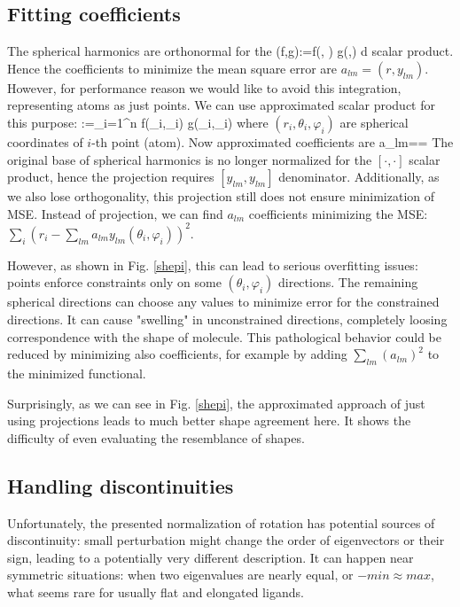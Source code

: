 \documentclass[10pt,journal]{IEEEtranTCOM}
\theoremstyle{plain}
\begin{document}
\subsection{Fitting coefficients} \label{fitting}
The spherical harmonics are orthonormal for the
\be (f,g):=\int f(\theta, \varphi) g(\theta,\varphi) d\Omega\ee
scalar product. Hence the coefficients to minimize the mean square error are $a_{lm}=(r,y_{lm})$. However, for performance reason we would like to avoid this integration, representing atoms as just points. We can use approximated scalar product for this purpose:
\be [f,g]:=\sum_{i=1}^n f(\theta_i,\varphi_i) g(\theta_i,\varphi_i)\ee
where $(r_i,\theta_i,\varphi_i)$ are spherical coordinates of $i$-th point (atom). Now approximated coefficients are
\be a_{lm}=\frac{[r,y_{lm}]}{[y_{lm},y_{lm}]}= \label{proj}\ee
The original base of spherical harmonics is no longer normalized for the $[\cdot,\cdot]$ scalar product, hence the projection requires $[y_{lm},y_{lm}]$ denominator. Additionally, as we also lose orthogonality, this projection still does not ensure minimization of MSE. Instead of projection, we can find $a_{lm}$ coefficients minimizing the MSE: $\sum_i \left(r_i - \sum_{lm} a_{lm} y_{lm}(\theta_i,\varphi_i)\right)^2$.

However, as shown in Fig. \ref{shepi}, this can lead to serious overfitting issues: points enforce constraints only on some $(\theta_i,\varphi_i)$ directions. The remaining spherical directions can choose any values to minimize error for the constrained directions. It can cause "swelling" in unconstrained directions, completely loosing correspondence with the shape of molecule. This pathological behavior could be reduced by minimizing also coefficients, for example by adding $\sum_{lm} (a_{lm})^2$ to the minimized functional.

Surprisingly, as we can see in Fig. \ref{shepi}, the approximated approach of just using projections leads to much better shape agreement here. It shows the difficulty of even evaluating the resemblance of shapes.
\subsection{Handling discontinuities}
Unfortunately, the presented normalization of rotation has potential sources of discontinuity: small perturbation might change the order of eigenvectors or their sign, leading to a potentially very different description. It can happen near symmetric situations: when two eigenvalues are nearly equal, or $-min\approx max$, what seems rare for usually flat and elongated ligands.
\end{document}

